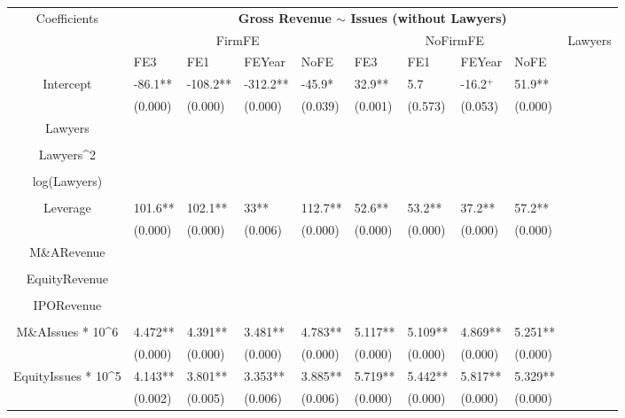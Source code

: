 \documentclass{article}
\begin{document}
\begin{table}[H]
\centering
\begin{tabular}{|clllllllll|}
\hline
\multirow{3}{*}{Coefficients} & \multicolumn{9}{c|}{\textbf{Gross Revenue $\sim$ Issues (without Lawyers)}} \\
\cline{2-10}
& \multicolumn{4}{c}{FirmFE} & \multicolumn{4}{c}{NoFirmFE} & \multirow{2}{*}{Lawyers} \\
\cline{2-9}
& FE3 & FE1 & FEYear & NoFE & FE3 & FE1 & FEYear & NoFE &  \\
\hline
 
Intercept & -86.1** & -108.2** & -312.2** & -45.9* & 32.9** & 5.7 & -16.2$^{+}$ & 51.9** & \\ 
   & (0.000) & (0.000) & (0.000) & (0.039) & (0.001) & (0.573) & (0.053) & (0.000) & \\ 
  Lawyers &  &  &  &  &  &  &  &  & \\ 
   &  &  &  &  &  &  &  &  & \\ 
  Lawyers^2 &  &  &  &  &  &  &  &  & \\ 
   &  &  &  &  &  &  &  &  & \\ 
  log(Lawyers) &  &  &  &  &  &  &  &  & \\ 
   &  &  &  &  &  &  &  &  & \\ 
  Leverage & 101.6** & 102.1** & 33** & 112.7** & 52.6** & 53.2** & 37.2** & 57.2** & \\ 
   & (0.000) & (0.000) & (0.006) & (0.000) & (0.000) & (0.000) & (0.000) & (0.000) & \\ 
  M\&ARevenue &  &  &  &  &  &  &  &  & \\ 
   &  &  &  &  &  &  &  &  & \\ 
  EquityRevenue &  &  &  &  &  &  &  &  & \\ 
   &  &  &  &  &  &  &  &  & \\ 
  IPORevenue &  &  &  &  &  &  &  &  & \\ 
   &  &  &  &  &  &  &  &  & \\ 
  M\&AIssues * 10^6 & 4.472** & 4.391** & 3.481** & 4.783** & 5.117** & 5.109** & 4.869** & 5.251** & \\ 
   & (0.000) & (0.000) & (0.000) & (0.000) & (0.000) & (0.000) & (0.000) & (0.000) & \\ 
  EquityIssues * 10^5 & 4.143** & 3.801** & 3.353** & 3.885** & 5.719** & 5.442** & 5.817** & 5.329** & \\ 
   & (0.002) & (0.005) & (0.006) & (0.006) & (0.000) & (0.000) & (0.000) & (0.000) & \\ 

\end{tabular}
\end{table}
\end{document}

